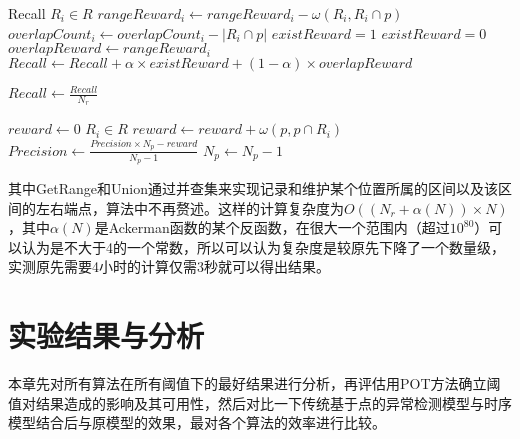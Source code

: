 \begin{breakablealgorithm}
\begin{algorithmic}[1]
      \State

      \State Recall 
      \ForAll $R_i \in R$
            \State $rangeReward_i \gets rangeReward_i - \omega(R_i,R_i \cap p)$
            \State $overlapCount_i \gets overlapCount_i - |R_i\cap p|$
              \State $existReward = 1$
            \Else
              \State $existReward = 0$
            \EndIf
            \State $overlapReward \gets rangeReward_i$
            \State $Recall \gets Recall +  \alpha \times existReward + (1-\alpha) \times overlapReward$
      \EndFor

      \State

      \State $Recall \gets \frac{Recall}{N_r}$

      \State $reward \gets 0$
      \ForAll $R_i \in R$
            \State $reward \gets reward + \omega(p, p \cap R_i)$
      \EndFor
      \State $Precision \gets \frac{Precision \times N_p - reward}{N_p - 1}$
      \State $N_p \gets N_p - 1$
      \EndFunction
    \end{algorithmic}
  \end{breakablealgorithm}

  其中GetRange和Union通过并查集来实现记录和维护某个位置所属的区间以及该区间的左右端点，算法中不再赘述。这样的计算复杂度为$O((N_r + \alpha(N))\times N)$，其中$\alpha(N)$是Ackerman函数的某个反函数，在很大一个范围内（超过$10^{80}$）可以认为是不大于4的一个常数，所以可以认为复杂度是较原先下降了一个数量级，实测原先需要4小时的计算仅需3秒就可以得出结果。
\section{实验结果与分析}
本章先对所有算法在所有阈值下的最好结果进行分析，再评估用POT方法确立阈值对结果造成的影响及其可用性，然后对比一下传统基于点的异常检测模型与时序模型结合后与原模型的效果，最对各个算法的效率进行比较。
